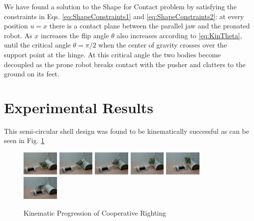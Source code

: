 \documentclass[letterpaper]{report}
\begin{document}
We have found a solution to the Shape for Contact problem by satisfying the constraints in Eqs. \ref{eq:ShapeConstraints1} and \ref{eq:ShapeConstraints2}: at every position $u = x$ there is a contact plane between the parallel jaw and the pronated robot.
As $x$ increases the flip angle $\theta$ also increases according to \ref{eq:KinTheta}, until the critical angle $\theta = \pi/2$ when the center of gravity crosses over the support point at the hinge.
At this critical angle the two bodies become decoupled as the prone robot breaks contact with the pusher and clatters to the ground on its feet.

\section{Experimental Results}

This semi-circular shell design was found to be kinematically successful as can be seen in Fig. \ref{fig:KinematicFlipRealLife}

\begin{figure}[ht]
  \centering
  \includegraphics[width=0.16\textwidth]{KinPanel0.jpg}
  \includegraphics[width=0.16\textwidth]{KinPanel1.jpg}
  \includegraphics[width=0.16\textwidth]{KinPanel2.jpg}
  \includegraphics[width=0.16\textwidth]{KinPanel3.jpg}
  \includegraphics[width=0.16\textwidth]{KinPanel5.jpg}
  \includegraphics[width=0.16\textwidth]{KinPanel6.jpg}
  \caption{\label{fig:KinematicFlipRealLife}Kinematic Progression of Cooperative Righting}
\end{figure}
\end{document}
